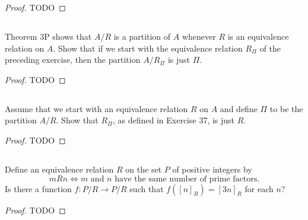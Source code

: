 \documentclass{report}
\begin{document}
\begin{proof}

  TODO

\end{proof}

\subsection{}%
\label{sub:exercise-3.38}

Theorem 3P shows that $A / R$ is a partition of $A$ whenever $R$ is an
  equivalence relation on $A$.
Show that if we start with the equivalence relation $R_\Pi$ of the preceding
  exercise, then the partition $A / R_\Pi$ is just $\Pi$.

\begin{proof}

  TODO

\end{proof}

\subsection{}%
\label{sub:exercise-3.39}

Assume that we start with an equivalence relation $R$ on $A$ and define $\Pi$ to
  be the partition $A / R$.
Show that $R_\Pi$, as defined in Exercise 37, is just $R$.

\begin{proof}

  TODO

\end{proof}

\subsection{}%
\label{sub:exercise-3.40}

Define an equivalence relation $R$ on the set $P$ of positive integers by
  $$mRn \iff m \text{ and } n \text{ have the same number of prime factors}.$$
Is there a function $f \colon P / R \rightarrow P / R$ such that
  $f([n]_R) = [3n]_R$ for each $n$?

\begin{proof}

  TODO

\end{proof}

\subsection{}%
\label{sub:exercise-3.41}
\end{document}
